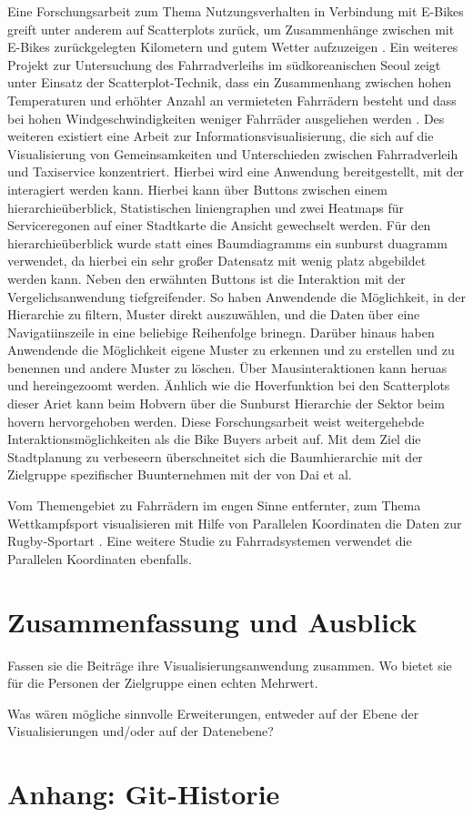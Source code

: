 \documentclass[usegeometry=true]{scrartcl}
\begin{document}
Eine Forschungsarbeit zum Thema Nutzungsverhalten in Verbindung mit E-Bikes greift unter anderem auf Scatterplots zurück, um Zusammenhänge zwischen mit E-Bikes zurückgelegten Kilometern und gutem Wetter aufzuzeigen \cite{Rios.06212016}. Ein weiteres Projekt zur Untersuchung des Fahrradverleihs im südkoreanischen Seoul zeigt unter Einsatz der Scatterplot-Technik, dass ein Zusammenhang zwischen hohen Temperaturen und erhöhter Anzahl an vermieteten Fahrrädern besteht und dass bei hohen Windgeschwindigkeiten weniger Fahrräder ausgeliehen werden \cite{Kashyap.2021}. 
Des weiteren existiert eine Arbeit zur Informationsvisualisierung, die sich auf die Visualisierung von Gemeinsamkeiten und Unterschieden zwischen Fahrradverleih und Taxiservice konzentriert. Hierbei wird eine Anwendung bereitgestellt, mit der interagiert werden kann. Hierbei kann über Buttons zwischen einem hierarchieüberblick, Statistischen liniengraphen und zwei Heatmaps für Serviceregonen auf einer Stadtkarte die Ansicht gewechselt werden. Für den hierarchieüberblick wurde statt eines Baumdiagramms ein sunburst duagramm verwendet, da hierbei ein sehr großer Datensatz mit wenig platz abgebildet werden kann. Neben den erwähnten Buttons ist die Interaktion mit der Vergelichsanwendung tiefgreifender. So haben Anwendende die Möglichkeit, in der Hierarchie zu filtern, Muster direkt auszuwählen, und die Daten über eine Navigatiinszeile in eine beliebige Reihenfolge brinegn. Darüber hinaus haben Anwendende die Möglichkeit eigene Muster zu erkennen und zu erstellen und zu benennen und andere Muster zu löschen. Über Mausinteraktionen kann heruas und hereingezoomt werden. Änhlich wie die Hoverfunktion bei den Scatterplots dieser Ariet kann beim Hobvern über die Sunburst Hierarchie der Sektor beim hovern hervorgehoben werden. Diese Forschungsarbeit weist weitergehebde Interaktionsmöglichkeiten als die Bike Buyers arbeit auf. Mit dem Ziel die Stadtplanung zu verbeseern überschneitet sich die Baumhierarchie mit der Zielgruppe spezifischer Buunternehmen mit der von Dai et al. \cite{Dai.2020}



Vom Themengebiet zu Fahrrädern im engen Sinne entfernter, zum Thema Wettkampfsport visualisieren mit Hilfe von Parallelen Koordinaten die Daten zur Rugby-Sportart \cite{Du.2021,Chung.2016}.
Eine weitere Studie zu Fahrradsystemen verwendet die Parallelen Koordinaten ebenfalls\cite{Shi.2018}.  
\section{Zusammenfassung und Ausblick}
Fassen sie die Beiträge ihre Visualisierungsanwendung zusammen. Wo bietet sie für die Personen der Zielgruppe einen echten Mehrwert.

Was wären mögliche sinnvolle Erweiterungen, entweder auf der Ebene der Visualisierungen und/oder auf der Datenebene?

\section*{Anhang: Git-Historie}
\newpage

\end{document}
